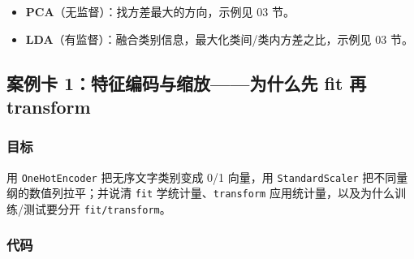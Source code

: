 \begin{itemize}
\tightlist
\item
  \textbf{PCA}（无监督）：找方差最大的方向，示例见 03 节。
\item
  \textbf{LDA}（有监督）：融合类别信息，最大化类间/类内方差之比，示例见
  03 节。
\end{itemize}

\subsection{案例卡 1：特征编码与缩放------为什么先 fit 再
transform}\label{ux6848ux4f8bux5361-1ux7279ux5f81ux7f16ux7801ux4e0eux7f29ux653eux4e3aux4ec0ux4e48ux5148-fit-ux518d-transform}

\subsubsection{目标}\label{ux76eeux6807-30}

用 \texttt{OneHotEncoder} 把无序文字类别变成 0/1 向量，用
\texttt{StandardScaler} 把不同量纲的数值列拉平；并说清 \texttt{fit}
学统计量、\texttt{transform} 应用统计量，以及为什么训练/测试要分开
\texttt{fit/transform}。

\subsubsection{代码}\label{ux4ee3ux7801-31}

